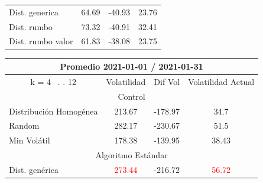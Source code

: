 \documentclass[12pt,a4paper]{article}
\begin{document}
\begin{table}[H]
\begin{tabular}{l|c|l|c|}
\hline
\rowcolor[rgb]{0.925,0.957,1} Dist. generica                           & 64.69                             & -40.93                             & 23.76                              \\
\rowcolor[rgb]{0.855,0.91,0.988} Dist. rumbo                           & 73.32                             & -40.91                             & 32.41                              \\
\rowcolor[rgb]{0.925,0.957,1} Dist. rumbo valor                        & 61.83                             & -38.08                             & \textcolor[rgb]{0,0.502,0}{23.75} 
\end{tabular}
\end{table}

\begin{table}[H]
\centering
\begin{tabular}{l|c|l|c|} 
\hline
\multicolumn{4}{c}{{\cellcolor[rgb]{0.635,0.647,0.788}}Promedio 2021-01-01 / 2021-01-31}                                                                                              \\ 
\hline
\multicolumn{1}{c|}{{\cellcolor[rgb]{0.635,0.647,0.788}}k = 4~ . . 12} & Volatilidad                       & Dif Vol                             & Volatilidad Actual                 \\ 
\hline
\multicolumn{4}{c}{{\cellcolor[rgb]{0.796,0.808,0.984}}Control}                                                                                                                       \\ 
\hline
\rowcolor[rgb]{0.925,0.957,1} Distribución Homogénea                   & 213.67                            & -178.97                             & 34.7                               \\
\rowcolor[rgb]{0.855,0.91,0.988} Random                                & 282.17                            & -230.67                             & 51.5                               \\
\rowcolor[rgb]{0.925,0.957,1} Min Volátil                              & 178.38                            & -139.95                             & 38.43                              \\ 
\hline
\multicolumn{4}{c}{{\cellcolor[rgb]{0.796,0.808,0.984}}Algoritmo Estándar}                                                                                                            \\ 
\hline
\rowcolor[rgb]{0.925,0.957,1} Dist. genérica                           & \textcolor{red}{273.44}           & \textcolor[rgb]{0,0.502,0}{-216.72} & \textcolor{red}{56.72}             \\

\end{tabular}
\end{table}
\end{document}
